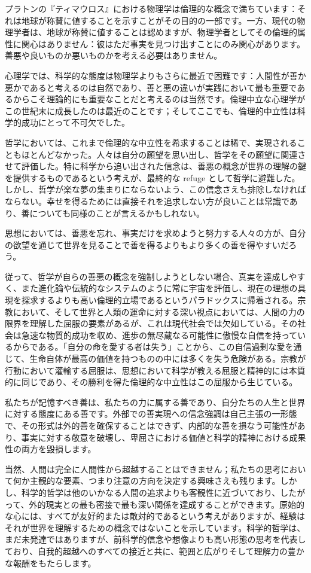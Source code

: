 \documentclass[a4paper,11pt,openany]{ltjsbook}
\begin{document}
プラトンの『ティマウロス』における物理学は倫理的な概念で満ちています：それは地球が称賛に値することを示すことがその目的の一部です。一方、現代の物理学者は、地球が称賛に値することは認めますが、物理学者としてその倫理的属性に関心はありません：彼はただ事実を見つけ出すことにのみ関心があります。善悪や良いものか悪いものかを考える必要はありません。

心理学では、科学的な態度は物理学よりもさらに最近で困難です：人間性が善か悪かであると考えるのは自然であり、善と悪の違いが実践において最も重要であるからこそ理論的にも重要なことだと考えるのは当然です。倫理中立な心理学がこの世紀末に成長したのは最近のことです；そしてここでも、倫理的中立性は科学的成功にとって不可欠でした。

哲学においては、これまで倫理的な中立性を希求することは稀で、実現されることもほとんどなかった。人々は自分の願望を思い出し、哲学をその願望に関連させて評価した。特に科学から追い出された信念は、善悪の概念が世界の理解の鍵を提供するものであるという考えが、最終的な refuge として哲学に避難した。しかし、哲学が楽な夢の集まりにならないよう、この信念さえも排除しなければならない。幸せを得るためには直接それを追求しない方が良いことは常識であり、善についても同様のことが言えるかもしれない。

思想においては、善悪を忘れ、事実だけを求めようと努力する人々の方が、自分の欲望を通じて世界を見ることで善を得るよりもより多くの善を得やすいだろう。

従って、哲学が自らの善悪の概念を強制しようとしない場合、真実を達成しやすく、また進化論や伝統的なシステムのように常に宇宙を評価し、現在の理想の具現を探求するよりも高い倫理的立場であるというパラドックスに帰着される。宗教において、そして世界と人類の運命に対する深い視点においては、人間の力の限界を理解した屈服の要素があるが、これは現代社会では欠如している。その社会は急速な物質的成功を収め、進歩の無尽蔵なる可能性に傲慢な自信を持っているからである。「自分の命を愛する者は失う」ことから、この自信過剰な愛を通じて、生命自体が最高の価値を持つものの中には多くを失う危険がある。宗教が行動において灌輸する屈服は、思想において科学が教える屈服と精神的には本質的に同じであり、その勝利を得た倫理的な中立性はこの屈服から生じている。


私たちが記憶すべき善は、私たちの力に属する善であり、自分たちの人生と世界に対する態度にある善です。外部での善実現への信念強調は自己主張の一形態で、その形式は外的善を確保することはできず、内部的な善を損なう可能性があり、事実に対する敬意を破壊し、卑屈さにおける価値と科学的精神における成果性の両方を毀損します。

当然、人間は完全に人間性から超越することはできません；私たちの思考において何か主観的な要素、つまり注意の方向を決定する興味さえも残ります。しかし、科学的哲学は他のいかなる人間の追求よりも客観性に近づいており、したがって、外的現実との最も密接で最も深い関係を達成することができます。原始的な心には、すべてが友好的または敵対的であるという考えがありますが、経験はそれが世界を理解するための概念ではないことを示しています。科学的哲学は、まだ未発達ではありますが、前科学的信念や想像よりも高い形態の思考を代表しており、自我的超越へのすべての接近と共に、範囲と広がりそして理解力の豊かな報酬をもたらします。
\end{document}
